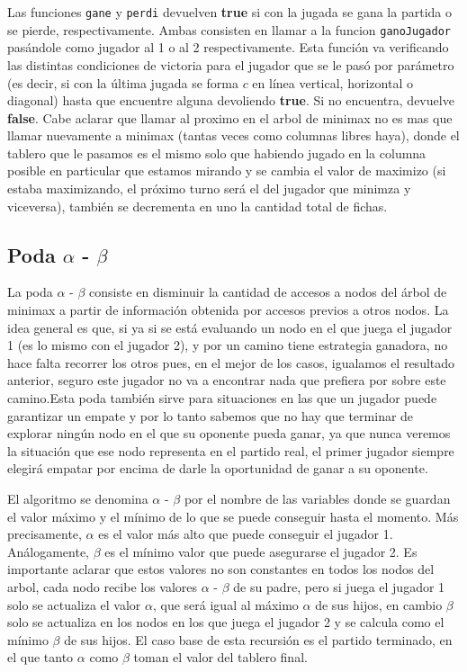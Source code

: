 \documentclass[A4paper,oneside,fleqn,11pt]{article}
\theoremstyle{definition}
\begin{document}
Las funciones \texttt{gane} y \texttt{perdi} devuelven \textbf{true} si con la jugada se gana la partida o se pierde, respectivamente. Ambas consisten en llamar a la funcion \texttt{ganoJugador} pasándole como jugador al 1 o al 2 respectivamente. Esta función va verificando las distintas condiciones de victoria para el jugador que se le pasó por parámetro (es decir, si con la última jugada se forma $c$ en línea vertical, horizontal o diagonal) hasta que encuentre alguna devoliendo \textbf{true}. Si no encuentra, devuelve \textbf{false}. Cabe aclarar que llamar al proximo en el arbol de minimax no es mas que llamar nuevamente a minimax (tantas veces como columnas libres haya), donde el tablero que le pasamos es el mismo solo que habiendo jugado en la columna posible en particular que estamos mirando y se cambia el valor de maximizo (si estaba maximizando, el próximo turno será el del jugador que minimza y viceversa), también se decrementa en uno la cantidad total de fichas.



\subsection{Poda $\alpha$ - $\beta$}

La poda $\alpha$ - $\beta$ consiste en disminuir la cantidad de accesos a nodos del árbol de minimax a partir de información obtenida por accesos previos a otros nodos. La idea general es que, si ya si se está evaluando un nodo en el que juega el jugador 1 (es lo mismo con el jugador 2), y por un camino tiene estrategia ganadora, no hace falta recorrer los otros pues, en el mejor de los casos, igualamos el resultado anterior, seguro este jugador no va a encontrar nada que prefiera por sobre este camino.Esta poda también sirve para situaciones en las que un jugador puede garantizar un empate y por lo tanto sabemos que no hay que terminar de explorar ningún nodo en el que su oponente pueda ganar, ya que nunca veremos la situación que ese nodo representa en el partido real, el primer jugador siempre elegirá empatar por encima de darle la oportunidad de ganar a su oponente.

El algoritmo se denomina $\alpha$ - $\beta$ por el nombre de las variables donde se guardan el valor máximo y el mínimo de lo que se puede conseguir hasta el momento. Más precisamente, $\alpha$ es el valor más alto que puede conseguir el jugador 1. Análogamente, $\beta$ es el mínimo valor que puede asegurarse el jugador 2. Es importante aclarar que estos valores no son constantes en todos los nodos del arbol, cada nodo recibe los valores  $\alpha$ - $\beta$ de su padre, pero si juega el jugador 1 solo se actualiza el valor  $\alpha$, que será igual al máximo  $\alpha$ de sus hijos, en cambio  $\beta$ solo se actualiza en los nodos en los que juega el jugador 2 y se calcula como el mínimo $\beta$ de sus hijos. El caso base de esta recursión es el partido terminado, en el que tanto $\alpha$ como $\beta$ toman el valor del tablero final.
\end{document}
